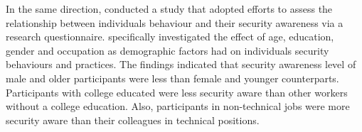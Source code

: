 In the same direction, \citet{Grant2010} conducted a study that adopted \citet{Katz2005} efforts to assess the relationship between individuals behaviour and their security awareness via a research questionnaire. \citet{Grant2010} specifically investigated the effect of age, education, gender and occupation as demographic factors had on individuals security behaviours and practices. The findings indicated that security awareness level of male and older participants were less than female and younger counterparts. Participants with college educated were less security aware than other workers without a college education. Also, participants in non-technical jobs were more security aware than their colleagues in technical positions.    
 

